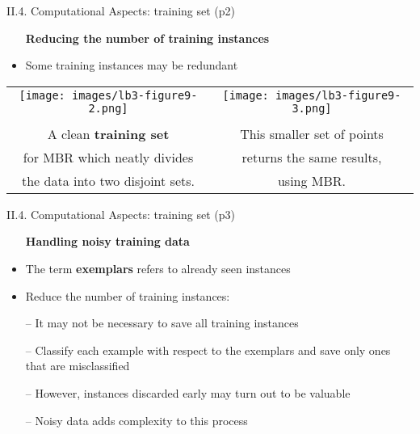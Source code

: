 \documentclass[handout]{beamer}
\newcommand{\strong}[1]{\textbf{\color{teal} #1}}
\newcommand{\stronger}[1]{\textbf{\color{purple} #1}}
\begin{document}
\begin{frame}{II.4. Computational Aspects: training set (p2)}
\begin{itemize}
\item[] \strong{Reducing the number of training instances}
\item[]
\item Some training instances may be redundant
\end{itemize}
\begin{center}
\begin{tabular}{cc}
\texttt{[image: images/lb3-figure9-2.png]} &
\texttt{[image: images/lb3-figure9-3.png]} \\
\cite[Figure 9.2]{LB3:2011} &
\cite[Figure 9.3]{LB3:2011} \\
A clean \textbf{training set} & This smaller set of points \\
for MBR which neatly divides  & returns the same results, \\
the data into two disjoint sets. & using MBR. \\
\end{tabular}
\end{center}
\end{frame}
\begin{frame}{II.4. Computational Aspects: training set (p3)}
\begin{itemize}
\item[] \strong{Handling noisy training data}
\item[]
\item The term \stronger{exemplars} refers to already seen instances
\item[]
\item Reduce the number of training instances:
\item[--] It may not be necessary to save all training instances
\item[--] Classify each example with respect to the exemplars and save only ones that are misclassified
\item[--] However, instances discarded early may turn out to be valuable
\item[--] Noisy data adds complexity to this process
\end{itemize}
\end{frame}
\end{document}
